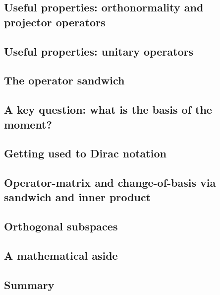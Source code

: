 \documentclass[main.tex]{subfiles}
\begin{document}
\subsection{Useful properties: orthonormality and projector operators}

\subsection{Useful properties: unitary operators}

\subsection{The operator sandwich}

\subsection{A key question: what is the basis of the moment?}

\subsection{Getting used to Dirac notation}

\subsection{Operator-matrix and change-of-basis via sandwich and inner product}

\subsection{Orthogonal subspaces}

\subsection{A mathematical aside}

\subsection{Summary}
\end{document}
